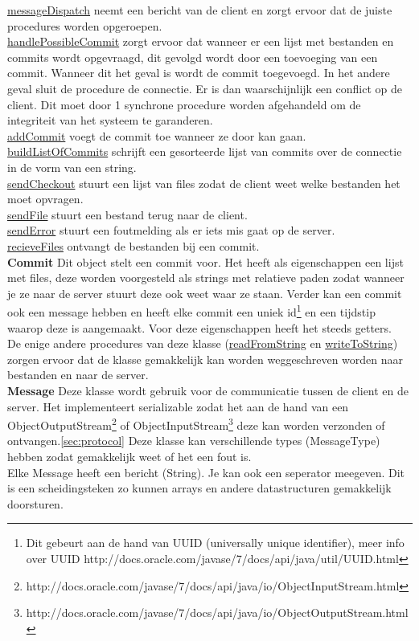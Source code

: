 \documentclass{article}
\begin{document}
\underline{messageDispatch} neemt een bericht van de client en zorgt ervoor dat de juiste procedures worden opgeroepen.\\
\underline{handlePossibleCommit} zorgt ervoor dat wanneer er een lijst met bestanden en commits wordt opgevraagd, dit gevolgd wordt door een toevoeging van een commit. Wanneer dit het geval is wordt de commit toegevoegd. In het andere geval sluit de procedure de connectie. Er is dan waarschijnlijk een conflict op de client. Dit moet door 1 synchrone procedure worden afgehandeld om de integriteit van het systeem te garanderen.\\
\underline{addCommit} voegt de commit toe wanneer ze door kan gaan.\\
\underline{buildListOfCommits} schrijft een gesorteerde lijst van commits over de connectie in de vorm van een string.\\
\underline{sendCheckout} stuurt een lijst van files zodat de client weet welke bestanden het moet opvragen.\\
\underline{sendFile} stuurt een bestand terug naar de client.\\
\underline{sendError} stuurt een foutmelding als er iets mis gaat op de server.\\
\underline{recieveFiles} ontvangt de bestanden bij een commit.\\

\textbf{Commit}\label{commit} Dit object stelt een commit voor. Het heeft als eigenschappen een lijst met files, deze worden voorgesteld als strings met relatieve paden zodat wanneer je ze naar de server stuurt deze ook weet waar ze staan. Verder kan een commit ook een message hebben en heeft elke commit een uniek id\footnote{Dit gebeurt aan de hand van UUID (universally unique identifier), meer info over UUID http://docs.oracle.com/javase/7/docs/api/java/util/UUID.html} en een tijdstip waarop deze is aangemaakt. Voor deze eigenschappen heeft het steeds getters.\\
De enige andere procedures van deze klasse (\underline{readFromString} en \underline{writeToString}) zorgen ervoor dat de klasse gemakkelijk kan worden weggeschreven worden naar bestanden en naar de server.\\


\textbf{Message}\label{message} Deze klasse wordt gebruik voor de communicatie tussen de client en de server. Het implementeert serializable zodat het aan de hand van een ObjectOutputStream\footnote{http://docs.oracle.com/javase/7/docs/api/java/io/ObjectInputStream.html} of ObjectInputStream\footnote{http://docs.oracle.com/javase/7/docs/api/java/io/ObjectOutputStream.html} deze kan worden verzonden of ontvangen.\ref{sec:protocol} Deze klasse kan verschillende types (MessageType) hebben zodat gemakkelijk weet of het een fout is.\\
Elke Message heeft een bericht (String). Je kan ook een seperator meegeven. Dit is een scheidingsteken zo kunnen arrays en andere datastructuren gemakkelijk doorsturen.\\
\end{document}
